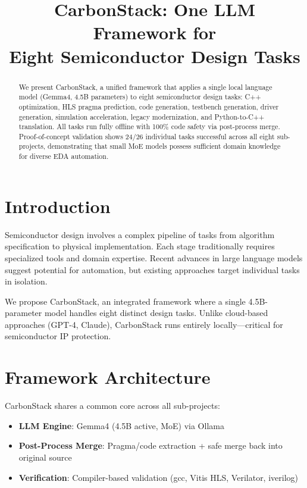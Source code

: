 \documentclass[conference]{IEEEtran}
\title{CarbonStack: One LLM Framework for\\Eight Semiconductor Design Tasks}
\author{
\IEEEauthorblockN{William Chen}
\IEEEauthorblockA{National Taiwan University}
}
\begin{document}
\maketitle

\begin{abstract}
We present CarbonStack, a unified framework that applies a single
local language model (Gemma4, 4.5B parameters) to eight semiconductor
design tasks: C++ optimization, HLS pragma prediction, code generation,
testbench generation, driver generation, simulation acceleration,
legacy modernization, and Python-to-C++ translation. All tasks run
fully offline with 100\% code safety via post-process merge.
Proof-of-concept validation shows 24/26 individual tasks successful
across all eight sub-projects, demonstrating that small MoE models
possess sufficient domain knowledge for diverse EDA automation.
\end{abstract}

\section{Introduction}

Semiconductor design involves a complex pipeline of tasks from
algorithm specification to physical implementation. Each stage
traditionally requires specialized tools and domain expertise.
Recent advances in large language models suggest potential for
automation, but existing approaches target individual tasks in
isolation.

We propose CarbonStack, an integrated framework where a single
4.5B-parameter model handles eight distinct design tasks. Unlike
cloud-based approaches (GPT-4, Claude), CarbonStack runs entirely
locally---critical for semiconductor IP protection.

\section{Framework Architecture}

CarbonStack shares a common core across all sub-projects:
\begin{itemize}
    \item \textbf{LLM Engine}: Gemma4 (4.5B active, MoE) via Ollama
    \item \textbf{Post-Process Merge}: Pragma/code extraction +
    safe merge back into original source
    \item \textbf{Verification}: Compiler-based validation
    (gcc, Vitis HLS, Verilator, iverilog)
\end{itemize}
\end{document}
